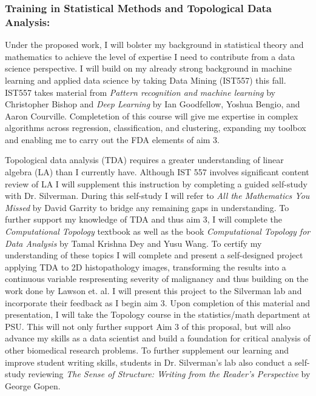 \documentclass{NIHGrant}
\begin{document}
\subsubsection*{Training in Statistical Methods and Topological Data Analysis:}
Under the proposed work, I will bolster my background in statistical theory and mathematics to achieve the level of expertise I need to contribute from a data science perspective. I will build on my already strong background in machine learning and applied data science by taking Data Mining (IST557) this fall. IST557 takes material from \textit{Pattern recognition and machine learning} by Christopher Bishop and \textit{Deep Learning} by Ian Goodfellow, Yoshua Bengio, and Aaron Courville. Completetion of this course will give me expertise in complex algorithms across regression, classification, and clustering, expanding my toolbox and enabling me to carry out the FDA elements of aim 3.

Topological data analysis (TDA) requires a greater understanding of linear algebra (LA) than I currently have. Although IST 557 involves significant content review of LA I will supplement this instruction by completing a guided self-study with Dr. Silverman. During this self-study I will refer to \textit{All the Mathematics You Missed} by David Garrity to bridge any remaining gaps in understanding. To further support my knowledge of TDA and thus aim 3, I will complete the \textit{Computational Topology} textbook as well as the book \textit{Computational Topology for Data Analysis} by Tamal Krishna Dey and Yusu Wang. To certify my understanding of these topics I will complete and present a self-designed project applying TDA to 2D histopathology images, transforming the results into a continuous variable respresenting severity of malignancy and thus building on the work done by Lawson et. al. I will present this project to the Silverman lab and incorporate their feedback as I begin aim 3. Upon completion of this material and presentation, I will take the Topology course in the statistics/math department at PSU. This will not only further support Aim 3 of this proposal, but will also advance my skills as a data scientist and build a foundation for critical analysis of other biomedical research problems. To further supplement our learning and improve student writing skills, students in Dr. Silverman's lab also conduct a self-study reviewing \textit{The Sense of Structure: Writing from the Reader's Perspective} by George Gopen.
\end{document}
